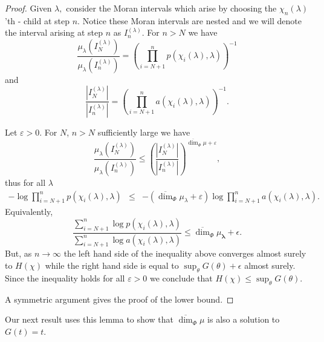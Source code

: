 \documentclass{amsart}
\theoremstyle{plain}
\numberwithin{equation}{section}
\newcommand{\blambda}{{\boldsymbol{\lambda}}}
\newcommand{\odim}{\overline{\dim}}
\begin{document}
\begin{proof}
Given $\lambda ,$ consider the Moran intervals which arise by choosing the $\chi _{n}(\lambda )$'th - child at step $n$. 
Notice these Moran intervals are nested and we will denote the interval arising at step $n$ as 
$I_{n}^{(\lambda )}$. 
For $n>N$ we have
\begin{equation*}
   \frac{\mu _{\lambda }(I_{N}^{(\lambda )})}{\mu _{\lambda }(I_{n}^{(\lambda)})}
      =\left( \prod_{i=N+1}^{n}p(\chi _{i}(\lambda ),\lambda )\right)^{-1}
\end{equation*}
and 
\begin{equation*}
  \frac{\left\vert I_{N}^{(\lambda )}\right\vert }{\left\vert I_{n}^{(\lambda)}\right\vert }
   =\left( \prod_{i=N+1}^{n}a(\chi _{i}(\lambda),\lambda )\right) ^{-1}.
\end{equation*}

Let $\varepsilon >0$. For $N$, $n>N$ sufficiently large we have 
\begin{equation*}
 \frac{\mu _{\lambda }(I_{N}^{(\lambda )})}{\mu _{\lambda }(I_{n}^{(\lambda)})}
  \leq 
   \left( \frac{\left\vert I_{N}^{(\lambda )}\right\vert }{\left\vert I_{n}^{(\lambda )}\right\vert }\right) ^{\odim_{\Phi }\mu
+\varepsilon },
\end{equation*}
thus for all $\lambda$
\begin{eqnarray*}
    -\log \prod_{i=N+1}^{n}p(\chi _{i}(\lambda ),\lambda ) &\leq &
         -(\odim_{\Phi }\mu _{\lambda }+\varepsilon )\log \prod_{i=N+1}^{n}a(\chi _{i}(\lambda ),\lambda ).%
\end{eqnarray*}%
Equivalently,
\begin{equation*}
 \frac{\sum_{i=N+1}^{n}\log p(\chi _{i}(\lambda ),\lambda )}{\sum_{i=N+1}^{n}\log a(\chi _{i}(\lambda ),\lambda )}
         \leq \odim_\Phi \mu_\blambda + \epsilon.
\end{equation*}
But, as $n\rightarrow \infty $ the left hand side of the inequality above converges almost surely to $H(\chi )$ while the right hand side is equal to $\sup_\theta G(\theta) + \epsilon$ almost surely. 
Since the inequality holds for all  $\varepsilon >0$ we conclude that $H(\chi )\leq \sup_{\theta }G(\theta )$.

A symmetric argument gives the proof of the lower bound.
\end{proof}

Our next result uses this lemma to show that $\odim_\Phi \mu$ is also a solution to $G(t) = t$.
\end{document}
